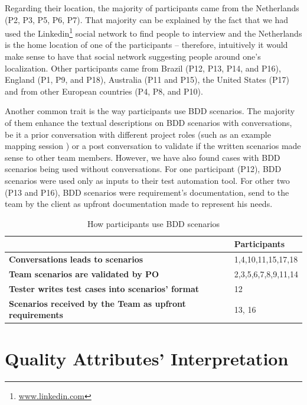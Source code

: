 Regarding their location, the majority of participants came from the Netherlands (P2, P3, P5, P6, P7). That majority can be explained by the fact that we had used the Linkedin\footnote{\url{www.linkedin.com}} social network to find people to interview and the Netherlands is the home location of one of the participants -- therefore, intuitively it would make sense to have that social network suggesting people around one's localization. Other participants came from Brazil (P12, P13, P14, and P16), England (P1, P9, and P18), Australia (P11 and P15), the United States (P17) and from other European countries (P4, P8, and P10).

Another common trait is the way participants use BDD scenarios. The majority of them enhance the textual descriptions on BDD scenarios with conversations, be it a prior conversation with different project roles (such as an example mapping session \cite{Wynne_2015}) or a post conversation to validate if the written scenarios made sense to other team members. However, we have also found cases with BDD scenarios being used without conversations. For one participant (P12), BDD scenarios were used only as inputs to their test automation tool. For other two (P13 and P16), BDD scenarios were requirement's documentation, send to the team by the client as upfront documentation made to represent his needs.  

\begin{table}[t]
	\caption{How participants use BDD scenarios}
	\label{tbl:profiles_how}
	\centering
	\begin{tabular}{|m{12cm}|m{4cm}|}
		\hline
		& Participants\\
		\hline
		\textbf{Conversations leads to scenarios} & 1,4,10,11,15,17,18\\
		\hline
		\textbf{Team scenarios are validated by PO} & 2,3,5,6,7,8,9,11,14\\
		\hline
		\textbf{Tester writes test cases into scenarios' format} & 12\\
		\hline 
		\textbf{Scenarios received by the Team as upfront requirements} & 13, 16\\
		\hline
	\end{tabular}
\end{table}

\section{\label{chap:chap4_attributes}Quality Attributes' Interpretation}

